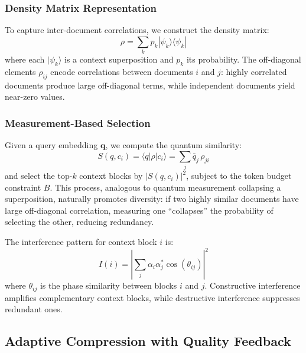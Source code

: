 \documentclass[11pt,a4paper]{article}
\newcommand{\ket}[1]{|#1\rangle}
\newcommand{\bra}[1]{\langle #1|}
\begin{document}
\subsubsection{Density Matrix Representation}

To capture inter-document correlations, we construct the density matrix:
\begin{equation}
  \rho = \sum_{k} p_k \ket{\psi_k}\bra{\psi_k}
  \label{eq:density}
\end{equation}
where each $\ket{\psi_k}$ is a context superposition and $p_k$ its
probability.  The off-diagonal elements $\rho_{ij}$ encode correlations
between documents $i$ and $j$: highly correlated documents produce large
off-diagonal terms, while independent documents yield near-zero values.

\subsubsection{Measurement-Based Selection}

Given a query embedding $\mathbf{q}$, we compute the quantum similarity:
\begin{equation}
  S(q, c_i) = \bra{q} \rho \ket{c_i}
  = \sum_j \bar{q}_j \, \rho_{ji}
  \label{eq:quantum-sim}
\end{equation}
and select the top-$k$ context blocks by $|S(q, c_i)|^2$, subject to the
token budget constraint $B$.  This process, analogous to quantum measurement
collapsing a superposition, naturally promotes diversity: if two highly
similar documents have large off-diagonal correlation, measuring one
``collapses'' the probability of selecting the other, reducing redundancy.

The interference pattern for context block $i$ is:
\begin{equation}
  I(i) = \left|\sum_j \alpha_i \alpha_j^* \cos(\theta_{ij})\right|^2
\end{equation}
where $\theta_{ij}$ is the phase similarity between blocks $i$ and $j$.
Constructive interference amplifies complementary context blocks, while
destructive interference suppresses redundant ones.

\subsection{Adaptive Compression with Quality Feedback}
\label{sec:compression}
\end{document}
